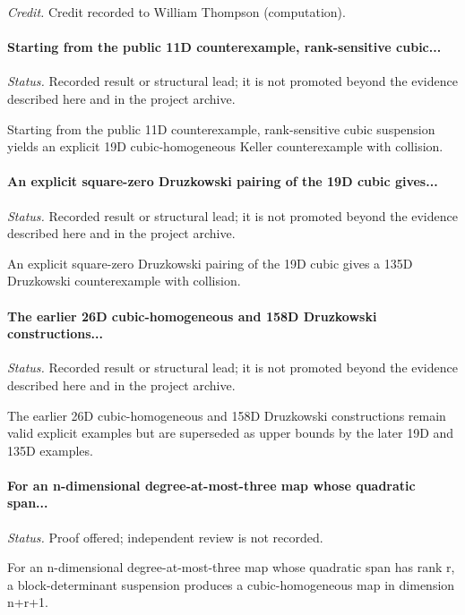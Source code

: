 \emph{Credit.} Credit recorded to William Thompson (computation).

\label{supp-note-05-003}
\paragraph{Starting from the public 11D counterexample, rank-sensitive cubic...}
\emph{Status.} Recorded result or structural lead; it is not promoted beyond the evidence described here and in the project archive.

Starting from the public 11D counterexample, rank-sensitive cubic suspension yields an explicit 19D cubic-homogeneous Keller counterexample with collision.

\label{supp-note-05-004}
\paragraph{An explicit square-zero Druzkowski pairing of the 19D cubic gives...}
\emph{Status.} Recorded result or structural lead; it is not promoted beyond the evidence described here and in the project archive.

An explicit square-zero Druzkowski pairing of the 19D cubic gives a 135D Druzkowski counterexample with collision.

\label{supp-note-05-005}
\paragraph{The earlier 26D cubic-homogeneous and 158D Druzkowski constructions...}
\emph{Status.} Recorded result or structural lead; it is not promoted beyond the evidence described here and in the project archive.

The earlier 26D cubic-homogeneous and 158D Druzkowski constructions remain valid explicit examples but are superseded as upper bounds by the later 19D and 135D examples.

\label{supp-note-05-006}
\paragraph{For an n-dimensional degree-at-most-three map whose quadratic span...}
\emph{Status.} Proof offered; independent review is not recorded.

For an n-dimensional degree-at-most-three map whose quadratic span has rank r, a block-determinant suspension produces a cubic-homogeneous map in dimension n+r+1.

